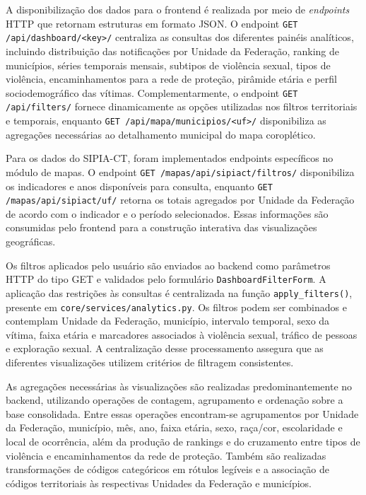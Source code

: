 \documentclass[11pt,a4paper]{article}
\begin{document}
A disponibilização dos dados para o frontend é realizada por meio de
\textit{endpoints} HTTP que retornam estruturas em formato JSON. O endpoint
\texttt{GET /api/dashboard/<key>/} centraliza as consultas dos diferentes
painéis analíticos, incluindo distribuição das notificações por Unidade da
Federação, ranking de municípios, séries temporais mensais, subtipos de
violência sexual, tipos de violência, encaminhamentos para a rede de proteção,
pirâmide etária e perfil sociodemográfico das vítimas. Complementarmente, o
endpoint \texttt{GET /api/filters/} fornece dinamicamente as opções utilizadas
nos filtros territoriais e temporais, enquanto
\texttt{GET /api/mapa/municipios/<uf>/} disponibiliza as agregações
necessárias ao detalhamento municipal do mapa coroplético.

Para os dados do SIPIA-CT, foram implementados endpoints específicos no
módulo de mapas. O endpoint
\texttt{GET /mapas/api/sipiact/filtros/} disponibiliza os indicadores e anos
disponíveis para consulta, enquanto
\texttt{GET /mapas/api/sipiact/uf/} retorna os totais agregados por Unidade da
Federação de acordo com o indicador e o período selecionados. Essas
informações são consumidas pelo frontend para a construção interativa das
visualizações geográficas.

Os filtros aplicados pelo usuário são enviados ao backend como parâmetros
HTTP do tipo GET e validados pelo formulário
\texttt{DashboardFilterForm}. A aplicação das restrições às consultas é
centralizada na função \texttt{apply\_filters()}, presente em
\texttt{core/services/analytics.py}. Os filtros podem ser combinados e
contemplam Unidade da Federação, município, intervalo temporal, sexo da
vítima, faixa etária e marcadores associados à violência sexual, tráfico de
pessoas e exploração sexual. A centralização desse processamento assegura que
as diferentes visualizações utilizem critérios de filtragem consistentes.

As agregações necessárias às visualizações são realizadas
predominantemente no backend, utilizando operações de contagem,
agrupamento e ordenação sobre a base consolidada. Entre essas operações
encontram-se agrupamentos por Unidade da Federação, município, mês, ano,
faixa etária, sexo, raça/cor, escolaridade e local de ocorrência, além da
produção de rankings e do cruzamento entre tipos de violência e
encaminhamentos da rede de proteção. Também são realizadas transformações de
códigos categóricos em rótulos legíveis e a associação de códigos
territoriais às respectivas Unidades da Federação e municípios.
\end{document}
